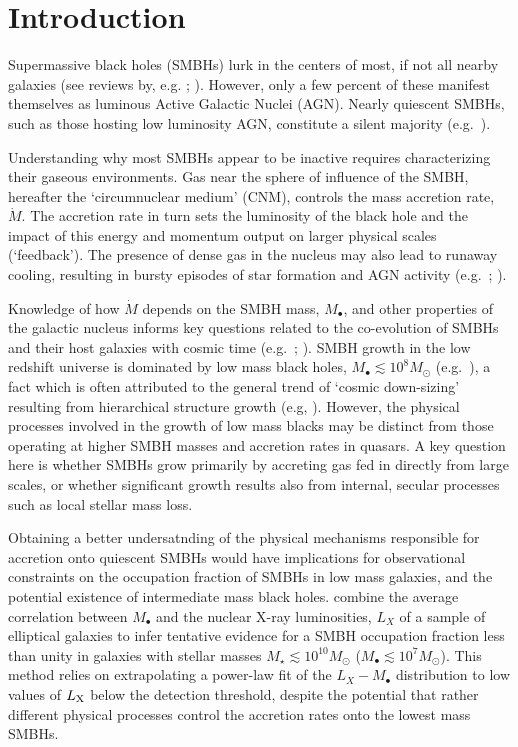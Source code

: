 \documentclass[usenatbib,fleqn]{mn2e}
\newcommand{\Mbh}[1][]{M_{\bullet#1}}
\begin{document}
\section{Introduction}
\label{sec:introduction}

Supermassive black holes (SMBHs) lurk in the centers of most, if not
all nearby galaxies (see reviews by,
e.g. \citealt{KormendyRichstone:1995a};
\citealt{FerrareseFord:2005a}). However, only a few percent of these
manifest themselves as luminous Active Galactic Nuclei (AGN).  Nearly
quiescent SMBHs, such as those hosting low luminosity AGN, constitute
a silent majority (e.g.~\citealt{Ho:2009a}).

Understanding why most SMBHs appear to be inactive requires
characterizing their gaseous environments.  Gas near the sphere of
influence of the SMBH, hereafter the `circumnuclear medium' (CNM),
controls the mass accretion rate, $\dot{M}$.  The accretion rate in
turn sets the luminosity of the black hole and the impact of this
energy and momentum output on larger physical scales (`feedback').
The presence of dense gas in the nucleus may also lead to runaway
cooling, resulting in bursty episodes of star formation and AGN
activity (e.g.~\citealt{Ciotti&Ostriker07}; \citealt{Ciotti+10}).

Knowledge of how $\dot{M}$ depends on the SMBH mass, $\Mbh$, and other
properties of the galactic nucleus informs key questions related to
the co-evolution of SMBHs and their host galaxies with cosmic time
(e.g.~\citealt{Kormendy&Ho13}; \citealt{Heckman&Best14}).  SMBH growth
in the low redshift universe is dominated by low mass black holes,
$M_{\bullet} \lesssim 10^{8}M_{\odot}$ (e.g.~\citealt{Heckman+04}), a
fact which is often attributed to the general trend of `cosmic
down-sizing' resulting from hierarchical structure growth (e.g,
\citealt{Gallo+08}).  However, the physical processes involved in the
growth of low mass blacks may be distinct from those operating at
higher SMBH masses and accretion rates in quasars.  A key question
here is whether SMBHs grow primarily by accreting gas fed in directly
from large scales, or whether significant growth results also from
internal, secular processes such as local stellar mass loss.

Obtaining a better undersatnding of the physical mechanisms
responsible for accretion onto quiescent SMBHs would have implications
for observational constraints on the occupation fraction of SMBHs in
low mass galaxies, and the potential existence of intermediate mass
black holes.  \citet{Miller+15} combine the average correlation
between $\Mbh$ and the nuclear X-ray luminosities, $L_{X}$ of a sample
of elliptical galaxies to infer tentative evidence for a SMBH
occupation fraction less than unity in galaxies with stellar masses
$M_{\star} \lesssim 10^{10}M_{\odot}$ ($M_{\bullet} \lesssim
10^{7}M_{\odot}$).  This method relies on extrapolating a power-law
fit of the $L_X-\Mbh$ distribution to low values of $L_{\rm X}$ below
the detection threshold, despite the potential that rather different
physical processes control the accretion rates onto the lowest mass
SMBHs.
\end{document}
